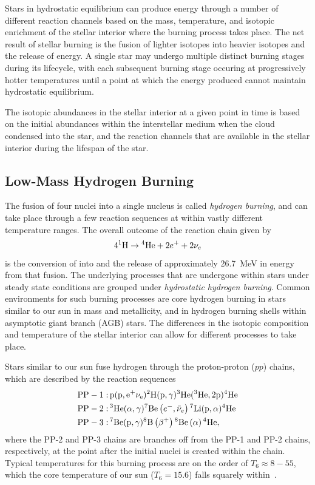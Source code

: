 Stars in hydrostatic equilibrium can produce energy through a number of
different reaction channels based on the mass, temperature, and isotopic
enrichment of the stellar interior where the burning process takes
place. The net result of stellar burning is the fusion of lighter
isotopes into heavier isotopes and the release of energy. A single star
may undergo multiple distinct burning stages during its lifecycle, with
each subsequent burning stage occuring at progressively hotter
temperatures until a point at which the energy produced cannot maintain
hydrostatic equilibrium.

The isotopic abundances in the stellar interior at a given point in time
is based on the initial abundances within the interstellar medium when
the cloud condensed into the star, and the reaction channels that are
available in the stellar interior during the lifespan of the star.

\subsection{Low-Mass Hydrogen Burning}

The fusion of four  nuclei into a single  nucleus
is called \emph{hydrogen burning}, and can take place through a few
reaction sequences at within vastly different temperature ranges. The
overall outcome of the reaction chain given by
\[
    4{}^{1}\textrm{H} \rightarrow{} {}^{4}\textrm{He} + 2e^+ + 2\nu_e
\]
is the conversion of  into  and the release of
approximately 26.7~MeV in energy from that fusion. The underlying
processes that are undergone within stars under steady state conditions
are grouped under \emph{hydrostatic hydrogen burning}. Common
environments for such burning processes are core hydrogen burning in
stars similar to our sun in mass and metallicity, and in hydrogen
burning shells within asymptotic giant branch (AGB) stars. The
differences in the isotopic composition and temperature of the stellar
interior can allow for different processes to take place.

Stars similar to our sun fuse hydrogen through the proton-proton ($pp$)
chains, which are described by the reaction sequences
\begin{align*}
    \rm{PP-1:\,}& \rm{p}(\rm{p},e^+\nu_e)
        {}^{2}\textrm{H}(\rm{p},\gamma)
        {}^{3}\textrm{He}({}^{3}\textrm{He},2\rm{p}){}^{4}\textrm{He} \\
    \rm{PP-2:\,}& {}^{3}\textrm{He}(\alpha,\gamma){}^{7}\textrm{Be}
        \left(e^-,\bar{\nu}_e\right){}^{7}\textrm{Li}(\rm{p},\alpha){}^{4}\textrm{He} \\
    \rm{PP-3:\,}& {}^{7}\textrm{Be}(\rm{p},\gamma){}^{8}\textrm{B}
        \left(\beta^+\right){}^{8}\textrm{Be}\left(\alpha\right){}^{4}\textrm{He},
\end{align*}
where the PP-2 and PP-3 chains are branches off from the PP-1 and PP-2
chains, respectively, at the point after the initial nuclei is created
within the chain. Typical temperatures for this burning process are on
the order of $T_6 \approx 8-55$, which the core temperature of our sun
($T_6 = 15.6$) falls squarely within~\cite{Iliadis}.

